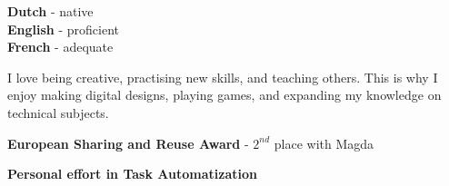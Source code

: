 \documentclass[9pt, blue, square]{developercv} %
\begin{document}
	
	
	\begin{minipage}[t]{0.3\textwidth}
		\vspace{-\baselineskip} %
		
		
		\textbf{Dutch} - native\\	
		\textbf{English} - proficient\\
		\textbf{French} - adequate
	\end{minipage}
	\hfill
	\begin{minipage}[t]{0.3\textwidth}
		\vspace{-\baselineskip} %
		
		
		I love being creative, practising new skills, and teaching others.
		This is why I enjoy making digital designs, playing games, and expanding my knowledge on technical subjects. 
	\end{minipage}
	\hfill
	\begin{minipage}[t]{0.3\textwidth}
		\vspace{-\baselineskip} %
		
		\textcolor{accentbackground}{\faTrophy} \textbf{European Sharing and Reuse Award} - $2^{nd}$ place with Magda
		
		\vspace{0.2cm}
		\textcolor{accentbackground}{\faHeartbeat} \textbf{Personal effort in Task Automatization}
	\end{minipage}
	
	
	\clearpage
	
	
	\vspace{0.8cm}
	
\end{document}
